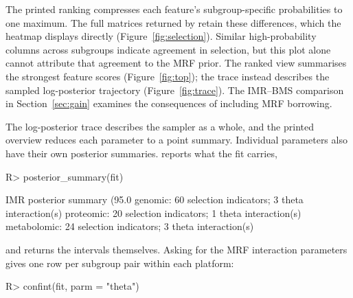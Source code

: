 \documentclass[article]{jss}
\begin{document}
The printed ranking compresses each feature's subgroup-specific probabilities
to one maximum. The full matrices returned by  retain these
differences, which the heatmap displays directly (Figure~\ref{fig:selection}).
Similar high-probability columns across subgroups indicate agreement in
selection, but this plot alone cannot attribute that agreement to the MRF
prior. The ranked view summarises the strongest feature scores
(Figure~\ref{fig:top}); the trace instead describes the sampled log-posterior
trajectory (Figure~\ref{fig:trace}). The IMR--BMS comparison in
Section~\ref{sec:gain} examines the consequences of including MRF borrowing.
{\color{blue}%
The log-posterior trace describes the sampler as a whole, and the printed
overview reduces each parameter to a point summary. Individual parameters also
have their own posterior summaries.  reports what
the fit carries,

\begin{CodeChunk}
\begin{CodeInput}
R> posterior_summary(fit)
\end{CodeInput}
\begin{CodeOutput}
IMR posterior summary (95.0%
  genomic: 60 selection indicators; 3 theta interaction(s)
  proteomic: 20 selection indicators; 1 theta interaction(s)
  metabolomic: 24 selection indicators; 3 theta interaction(s)
\end{CodeOutput}
\end{CodeChunk}

and  returns the intervals themselves. Asking for the MRF
interaction parameters gives one row per subgroup pair within each platform:

\begin{CodeChunk}
\begin{CodeInput}
R> confint(fit, parm = "theta")
\end{CodeInput}
\end{CodeChunk}

}
\end{document}
